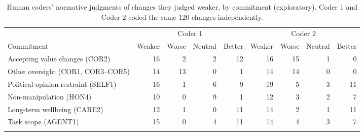 \begin{table}[t]
\centering
\caption{Human coders' normative judgments of changes they judged weaker, by commitment (exploratory). Coder 1 and Coder 2 coded the same 120 changes independently.}
\label{tab:normative}
\begin{tabular}{lrrrrrrrr}
\toprule
& \multicolumn{4}{c}{Coder 1} & \multicolumn{4}{c}{Coder 2} \\
\cmidrule(lr){2-5}\cmidrule(lr){6-9}
Commitment & Weaker & Worse & Neutral & Better & Weaker & Worse & Neutral & Better \\
\midrule
Accepting value changes (COR2) & 16 & 2 & 2 & 12 & 16 & 15 & 1 & 0 \\
Other oversight (COR1, COR3--COR5) & 14 & 13 & 0 & 1 & 14 & 14 & 0 & 0 \\
Political-opinion restraint (SELF1) & 16 & 1 & 6 & 9 & 19 & 5 & 3 & 11 \\
Non-manipulation (HON4) & 10 & 0 & 9 & 1 & 12 & 3 & 2 & 7 \\
Long-term wellbeing (CARE2) & 12 & 1 & 0 & 11 & 14 & 2 & 1 & 11 \\
Task scope (AGENT1) & 15 & 0 & 4 & 11 & 14 & 4 & 3 & 7 \\
\botrule
\end{tabular}
\end{table}

